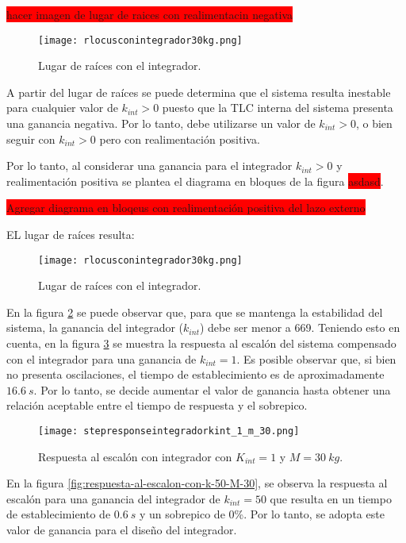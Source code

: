 \colorbox{red}{hacer imagen de lugar de raices con realimentacin negativa}

\begin{figure}[H]
	\centering
	\texttt{[image: rlocusconintegrador30kg.png]}
	\caption{Lugar de raíces con el integrador.}
	\label{fig:lugar-de-raices-con-integrador-analog}
\end{figure}

A partir del lugar de raíces se puede determina que el sistema resulta inestable para cualquier valor de $k_{int}>0$ puesto que la TLC interna del sistema presenta una ganancia negativa. Por lo tanto, debe utilizarse un valor de $k_{int}>0$, o bien seguir con $k_{int}>0$ pero con realimentación positiva. 

Por lo tanto, al considerar una ganancia para el integrador $k_{int}>0$ y realimentación positiva se plantea el diagrama en bloques de la figura \colorbox{red}{asdasd}.

\colorbox{red}{Agregar diagrama en bloqeus con realimentación positiva del lazo externo}

EL lugar de raíces resulta:

\begin{figure}[H]
	\centering
	\texttt{[image: rlocusconintegrador30kg.png]}
	\caption{Lugar de raíces con el integrador.}
	\label{fig:lugar-de-raices-con-integrador-analog}
\end{figure}
 
\noindent En la figura \ref{fig:lugar-de-raices-con-integrador-analog} se puede observar que, para que se mantenga la estabilidad del sistema, la ganancia del integrador ($k_{int}$) debe ser menor a 669. Teniendo esto en cuenta, en la figura \ref{fig:respuesta-al-escalon-con-k-1-M-30-analog} se muestra la respuesta al escalón del sistema compensado con el integrador para una ganancia de $k_{int}=1$. Es posible observar que, si bien no presenta oscilaciones, el tiempo de establecimiento es de aproximadamente $16.6 \:s$. Por lo tanto, se decide aumentar el valor de ganancia hasta obtener una relación aceptable entre el tiempo de respuesta y el sobrepico.

\begin{figure}[H]
	\centering
	\texttt{[image: stepresponseintegradorkint\_1\_m\_30.png]}
	\caption{Respuesta al escalón con integrador con $K_{int} =1$ y $M=30\:kg$.}
	\label{fig:respuesta-al-escalon-con-k-1-M-30-analog}
\end{figure}

\noindent En la figura \ref{fig:respuesta-al-escalon-con-k-50-M-30}, se observa la respuesta al escalón para una ganancia del integrador de $k_{int}=50$ que resulta en un tiempo de establecimiento de $0.6\:s$ y un sobrepico de 0\%. Por lo tanto, se adopta este valor de ganancia para el diseño del integrador.

